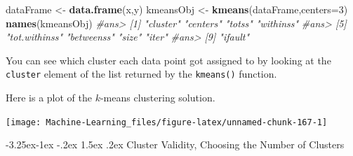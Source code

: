 \documentclass[]{book}
\makeatletter
\newenvironment{Shaded}{\begin{snugshade}}{\end{snugshade}}
\newcommand{\KeywordTok}[1]{\textcolor[rgb]{0.13,0.29,0.53}{\textbf{#1}}}
\newcommand{\DataTypeTok}[1]{\textcolor[rgb]{0.13,0.29,0.53}{#1}}
\newcommand{\DecValTok}[1]{\textcolor[rgb]{0.00,0.00,0.81}{#1}}
\newcommand{\StringTok}[1]{\textcolor[rgb]{0.31,0.60,0.02}{#1}}
\newcommand{\CommentTok}[1]{\textcolor[rgb]{0.56,0.35,0.01}{\textit{#1}}}
\newcommand{\OperatorTok}[1]{\textcolor[rgb]{0.81,0.36,0.00}{\textbf{#1}}}
\newcommand{\NormalTok}[1]{#1}
\let\origfigure\figure
\let\endorigfigure\endfigure
\renewenvironment{figure}[1][2] {
    \expandafter\origfigure\expandafter[H]
} {
    \endorigfigure
}
\renewcommand\subsection{\@startsection{subsection}{2}{\z@}%
                                     {-3.25ex\@plus -1ex \@minus -.2ex}%
                                     {1.5ex \@plus .2ex}%
                                     {\normalfont\large\bfseries\color{Violet}}}
\theoremstyle{definition}
\theoremstyle{definition}
\theoremstyle{definition}
\theoremstyle{remark}
\makeatother
\begin{document}
\begin{Shaded}
\begin{Highlighting}[]
\NormalTok{dataFrame <-}\StringTok{ }\KeywordTok{data.frame}\NormalTok{(x,y)}
\NormalTok{kmeansObj <-}\StringTok{ }\KeywordTok{kmeans}\NormalTok{(dataFrame,}\DataTypeTok{centers=}\DecValTok{3}\NormalTok{)}
\KeywordTok{names}\NormalTok{(kmeansObj)}
\CommentTok{#ans> [1] "cluster"      "centers"      "totss"        "withinss"    }
\CommentTok{#ans> [5] "tot.withinss" "betweenss"    "size"         "iter"        }
\CommentTok{#ans> [9] "ifault"}
\end{Highlighting}
\end{Shaded}

You can see which cluster each data point got assigned to by looking at
the \texttt{cluster} element of the list returned by the
\texttt{kmeans()} function.

\begin{Shaded}
\end{Shaded}

Here is a plot of the \(k\)-means clustering solution.

\begin{Shaded}
\end{Shaded}

\begin{figure}

{\centering \texttt{[image: Machine-Learning\_files/figure-latex/unnamed-chunk-167-1]} 

}

\caption{$k$-means clustering solution}\label{fig:unnamed-chunk-167}
\end{figure}

\subsection{Cluster Validity, Choosing the Number of
Clusters}\label{cluster-validity-choosing-the-number-of-clusters}
\end{document}
